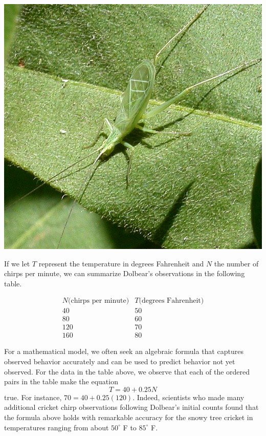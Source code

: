\documentclass{ximera}
\begin{document}
\begin{image}
\includegraphics{CompositionText3.jpg}
\end{image}

If we let $T$ represent the temperature in degrees Fahrenheit and $N$ the number of chirps per minute, we can summarize Dolbear's observations in the following table.

$$
\begin{array}{cc}
N \text{(chirps per minute)} & T \text{(degrees Fahrenheit)}\\
\hline
40&50\\
80&60\\
120&70\\
160&80
\end{array}
$$

For a mathematical model, we often seek an algebraic formula that captures observed behavior accurately and can be used to predict behavior not yet observed.  For the data in the table above, we observe that each of the ordered pairs in the table make the equation%
\begin{equation}
T = 40 + 0.25N
\end{equation}
true.  For instance, $70 = 40 + 0.25(120)$.  Indeed, scientists who made many additional cricket chirp observations following Dolbear's initial counts found that the formula above holds with remarkable accuracy for the snowy tree cricket in temperatures ranging from about $50^\circ$ F to $85^\circ$ F.
\end{document}
